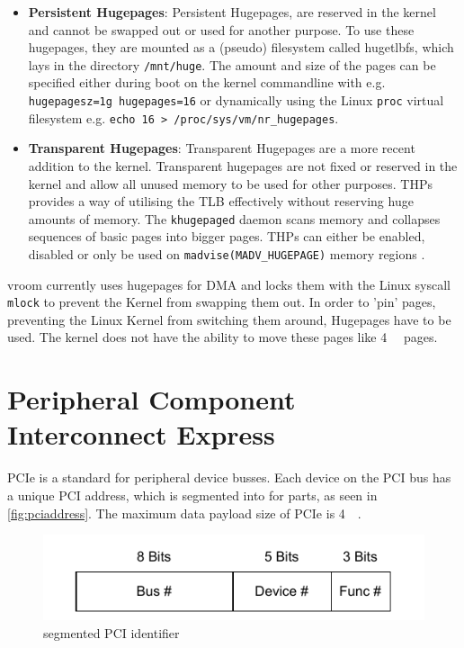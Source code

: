 \begin{itemize}
    \item \textbf{Persistent Hugepages}: Persistent Hugepages, are reserved in the kernel and cannot be swapped out or used for another purpose. To use these hugepages, they are mounted as a (pseudo) filesystem called hugetlbfs, which lays in the directory \texttt{/mnt/huge}. The amount and size of the pages can be specified either during boot on the kernel commandline with e.g. \texttt{hugepagesz=1g hugepages=16} or dynamically using the Linux \texttt{proc} virtual filesystem e.g. \texttt{echo 16 > /proc/sys/vm/nr\_hugepages}\cite{hugetlbkerneldocs}.
    \item \textbf{Transparent Hugepages}: Transparent Hugepages are a more recent addition to the kernel. Transparent hugepages are not fixed or reserved in the kernel and allow all unused memory to be used for other purposes. THPs provides a way of utilising the TLB effectively without reserving huge amounts of memory. The \texttt{khugepaged} daemon scans memory and collapses sequences of basic pages into bigger pages. THPs can either be enabled, disabled or only be used on \texttt{madvise(MADV\_HUGEPAGE)} memory regions \cite{transhugekerneldocs}.
\end{itemize}

vroom currently uses hugepages for DMA and locks them with the Linux syscall \texttt{mlock} to prevent the Kernel from swapping them out. In order to 'pin' pages, preventing the Linux Kernel from switching them around, Hugepages have to be used. The kernel does not have the ability to move these pages like \qty{4}{\kibi\byte} pages.

\section{Peripheral Component Interconnect Express}
PCIe is a standard for peripheral device busses. Each device on the PCI bus has a unique PCI address, which is segmented into for parts, as seen in \autoref{fig:pciaddress}. The maximum data payload size of PCIe is \qty{4}{\kibi\byte}.

\begin{figure}[H]
    \centering
    \includegraphics[width=.7\textwidth]{figures/pciaddress.pdf}
    \caption{segmented PCI identifier}
    \label{fig:pciaddress}
\end{figure}


